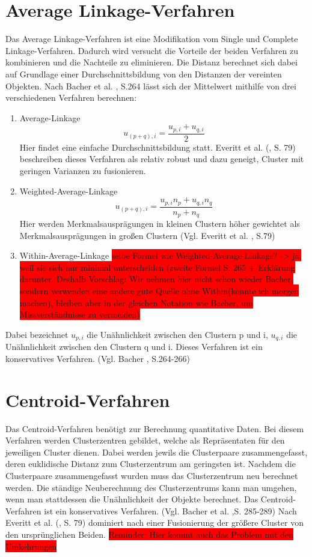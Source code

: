 \section{Average Linkage-Verfahren}
Das Average Linkage-Verfahren ist eine Modifikation vom Single und Complete Linkage-Verfahren. Dadurch wird versucht die Vorteile der beiden Verfahren zu kombinieren und die Nachteile zu eliminieren. Die Distanz berechnet sich dabei auf Grundlage einer Durchschnittsbildung von den Distanzen der vereinten Objekten.
Nach Bacher et al. \cite{Bacher.2010}, S.264 lässt sich der Mittelwert mithilfe von drei verschiedenen Verfahren berechnen:
\begin{enumerate}
	\item Average-Linkage
	\begin{equation}
		u_{(p+q),i} = \frac{u_{p,i} + u_{q,i}}{2}
	\end{equation}
	Hier findet eine einfache Durchschnittsbildung statt. Everitt et al. (\cite{Everitt.2011}, S. 79) beschreiben dieses Verfahren als relativ robust und dazu geneigt, Cluster mit geringen Varianzen zu fusionieren.
	\item Weighted-Average-Linkage
	\begin{equation}
		u_{(p+q),i} = \frac{u_{p,i}n_{p} + u_{q,i}n_{q}}{n_{p} + n_{q}}
	\end{equation}
	Hier werden Merkmalsausprägungen in kleinen Clustern höher gewichtet als Merkmalsausprägungen in großen Clustern (Vgl. Everitt et al. \cite{Everitt.2011}, S.79)
	\item Within-Average-Linkage \colorbox{red}{selbe Formel wie Weighted-Average-Linkage? -> ja, weil sie sich nur minimal unterscheiden (zweite Formel S. 265 + Erklärung darunter. Deshalb Vorschlag: Wir nehmen hier nicht schon wieder Bacher, sondern verwenden eine andere gute Quelle ohne Within(könnte ich morgen machen), bleiben aber in der gleichen Notation wie Bacher, um Missverständnisse zu vermeiden)}
\end{enumerate}
Dabei bezeichnet $u_{p,i}$ die Unähnlichkeit zwischen den Clustern p und i, $u_{q,i}$ die Unähnlichkeit zwischen den Clustern q und i.
Dieses Verfahren ist ein konservatives Verfahren. (Vgl. Bacher \cite{Bacher.2010}, S.264-266)  

\section{Centroid-Verfahren}
Das Centroid-Verfahren benötigt zur Berechnung quantitative Daten. Bei diesem Verfahren werden Clusterzentren gebildet, welche als Repräsentaten für den jeweiligen Cluster dienen. Dabei werden jewils die Clusterpaare zusammengefasst, deren euklidische Distanz zum Clusterzentrum am geringsten ist. Nachdem die Clusterpaare zusammengefasst wurden muss das Clusterzentrum neu berechnet werden. Die ständige Neuberechnung des Clusterzentrums kann man umgehen, wenn man stattdessen die Unähnlichkeit der Objekte berechnet. Das Centroid-Verfahren ist ein konservatives Verfahren. (Vgl. Bacher et al. \cite{Bacher.2010},S. 285-289) Nach Everitt et al. (\cite{Everitt.2011}, S. 79) dominiert nach einer Fusionierung der größere Cluster von den ursprünglichen Beiden.
\colorbox{red}{Reminder: Hier kommt auch das Problem mit den Umkehrungen}

